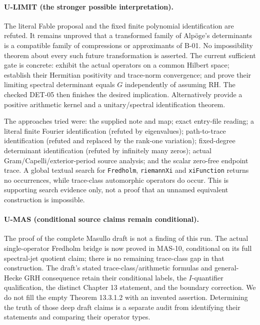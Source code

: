 \documentclass[11pt,a4paper]{article}
\newcommand{\fid}[1]{\textsf{#1}}
\begin{document}
\paragraph{U-LIMIT (the stronger possible interpretation).}
The literal Fable proposal and the fixed finite polynomial identification are refuted. It remains unproved that a transformed family of Alp\"oge's determinants is a compatible family of compressions or approximants of \fid{B-01}. No impossibility theorem about every such future transformation is asserted. The current sufficient gate is concrete: exhibit the actual operators on a common Hilbert space; establish their Hermitian positivity and trace-norm convergence; and prove their limiting spectral determinant equals $G$ independently of assuming RH. The checked \fid{DET-05} then finishes the desired implication. Alternatively provide a positive arithmetic kernel and a unitary/spectral identification theorem.

The approaches tried were: the supplied note and map; exact entry-file reading; a literal finite Fourier identification (refuted by eigenvalues); path-to-trace identification (refuted and replaced by the rank-one variation); fixed-degree determinant identification (refuted by infinitely many zeros); actual Gram/Capelli/exterior-period source analysis; and the scalar zero-free endpoint trace. A global textual search for \texttt{Fredholm}, \texttt{riemannXi} and \texttt{xiFunction} returns no occurrences, while trace-class automorphic operators do occur. This is supporting search evidence only, not a proof that an unnamed equivalent construction is impossible.

\paragraph{U-MAS (conditional source claims remain conditional).}
The proof of the complete Masullo draft is not a finding of this run. The actual single-operator Fredholm bridge is now proved in \fid{MAS-10}, conditional on its full spectral-jet quotient claim; there is no remaining trace-class gap in that construction. The draft's stated trace-class/arithmetic formulas and general-Hecke GRH consequence retain their conditional labels, the $I$-quantifier qualification, the distinct Chapter 13 statement, and the boundary correction. We do not fill the empty Theorem 13.3.1.2 with an invented assertion. Determining the truth of those deep draft claims is a separate audit from identifying their statements and comparing their operator types.
\end{document}

